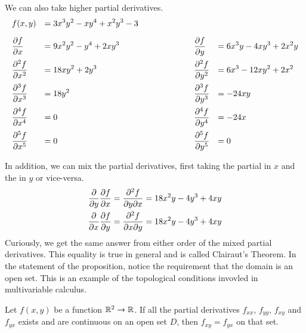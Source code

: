 \documentclass[fleqn,letterpaper]{report}
\begin{document}
\begin{example}
We can also take higher partial derivatives.
\begin{displaymath}
\begin{array}{*4{>{\displaystyle}l}}
f(x,y) & = 3x^3 y^2 - xy^4 + x^2 y^3 - 3 & & \\[1em]
\frac{\del f}{\del x } & = 9x^2y^2 - y^4 + 2xy^3 & 
\hspace{2cm} \frac{\del f}{\del y } & = 6x^3y - 4xy^3 + 2x^2y
\\[1em]
\frac{\del^2 f}{\del x^2 } & = 18xy^2 + 2y^3 &
\hspace{2cm} \frac{\del^2 f}{\del y^2 } & = 6x^3 - 12xy^2 +
2x^2 \\[1em]
\frac{\del^3 f}{\del x^3 } & = 18y^2 &
\hspace{2cm} \frac{\del^3 f}{\del y^3 } & = -24xy \\ [1em]
\frac{\del^4 f}{\del x^4 } & = 0 &
\hspace{2cm} \frac{\del^4 f}{\del y^4 } & = -24x \\[1em]
\frac{\del^5 f}{\del x^5 } & = 0 &
\hspace{2cm} \frac{\del^5 f}{\del y^5 } & = 0 
\end{array}
\end{displaymath}
\end{example}

\begin{example}
In addition, we can mix the partial derivatives, first taking
the partial in $x$ and the in $y$ or vice-versa. 
\begin{align*}
\frac{\partial}{\partial y} \frac{\partial f}{\partial x} = \frac{\partial^2
f}{\partial y \partial x} = 18x^2y - 4y^3 + 4xy \\
\frac{\partial}{\partial x} \frac{\partial f}{\partial y} = \frac{\partial^2
f}{\partial x \partial y} = 18x^2y - 4y^3 + 4xy 
\end{align*}
Curiously, we get the same answer from either order of the
mixed partial derivatives. This equality is true in general
and is called Clairaut's Theorem. In the statement of the
proposition, notice the requirement that the domain is an open
set. This is an example of the topological conditions invovled
in multivariable calculus. 
\end{example}

\begin{prop}
Let $f(x,y)$ be a function $\mathbb{R}^2 \rightarrow \mathbb{R}$. If all the
partial derivatives $f_{xx}$, $f_{yy}$, $f_{xy}$ and $f_{yx}$
exists and are continuous on an open set $D$, then $f_{xy} =
f_{yx}$ on that set.
\end{prop}
\end{document}
